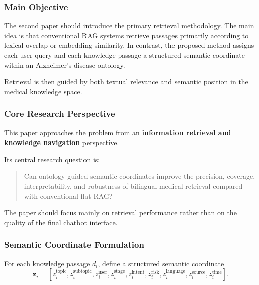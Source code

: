 \documentclass{article}
\begin{document}



\subsubsection{Main Objective}

The second paper should introduce the primary retrieval methodology. The main idea is that conventional RAG systems retrieve passages primarily according to lexical overlap or embedding similarity. In contrast, the proposed method assigns each user query and each knowledge passage a structured semantic coordinate within an Alzheimer's disease ontology.

Retrieval is then guided by both textual relevance and semantic position in the medical knowledge space.

\subsubsection{Core Research Perspective}

This paper approaches the problem from an \textbf{information retrieval and knowledge navigation} perspective.

Its central research question is:
\begin{quote}
Can ontology-guided semantic coordinates improve the precision, coverage, interpretability, and robustness of bilingual medical retrieval compared with conventional flat RAG?
\end{quote}

The paper should focus mainly on retrieval performance rather than on the quality of the final chatbot interface.

\subsubsection{Semantic Coordinate Formulation}

For each knowledge passage $d_i$, define a structured semantic coordinate
\begin{equation}
    \mathbf{z}_i =
    \left[
    z_i^{\mathrm{topic}},
    z_i^{\mathrm{subtopic}},
    z_i^{\mathrm{user}},
    z_i^{\mathrm{stage}},
    z_i^{\mathrm{intent}},
    z_i^{\mathrm{risk}},
    z_i^{\mathrm{language}},
    z_i^{\mathrm{source}},
    z_i^{\mathrm{time}}
    \right].
\end{equation}
\end{document}
